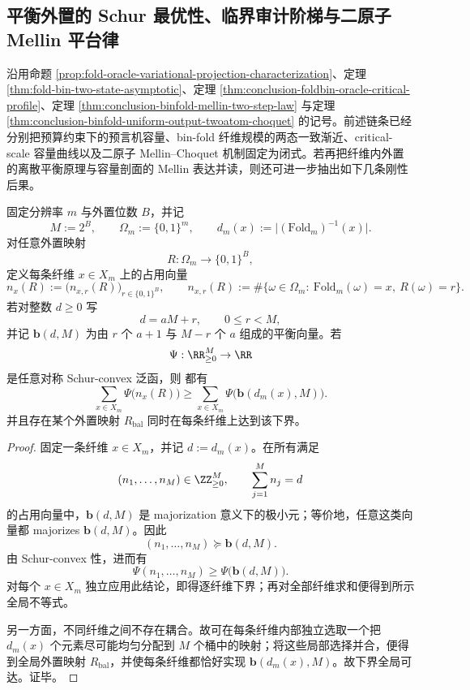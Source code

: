 \subsection{平衡外置的 Schur 最优性、临界审计阶梯与二原子 Mellin 平台律}\label{subsec:conclusion-balanced-externalization-harmonic-staircase-mellin-plateau}
沿用命题 \ref{prop:fold-oracle-variational-projection-characterization}、定理 \ref{thm:fold-bin-two-state-asymptotic}、定理 \ref{thm:conclusion-foldbin-oracle-critical-profile}、定理 \ref{thm:conclusion-binfold-mellin-two-step-law} 与定理 \ref{thm:conclusion-binfold-uniform-output-twoatom-choquet} 的记号。前述链条已经分别把预算约束下的预言机容量、bin-fold 纤维规模的两态一致渐近、critical-scale 容量曲线以及二原子 Mellin--Choquet 机制固定为闭式。若再把纤维内外置的离散平衡原理与容量剖面的 Mellin 表达并读，则还可进一步抽出如下几条刚性后果。

\begin{theorem}\label{thm:conclusion-balanced-externalization-schur-optimality}
固定分辨率 \(m\) 与外置位数 \(B\)，并记
\[
M:=2^B,\qquad
\Omega_m:=\{0,1\}^m,
\qquad
d_m(x):=\bigl|(\mathrm{Fold}_m)^{-1}(x)\bigr|.
\]
对任意外置映射
\[
R:\Omega_m\to\{0,1\}^B,
\]
定义每条纤维 \(x\in X_m\) 上的占用向量
\[
n_x(R):=\bigl(n_{x,r}(R)\bigr)_{r\in\{0,1\}^B},
\qquad
n_{x,r}(R):=\#\{\omega\in\Omega_m:\ \mathrm{Fold}_m(\omega)=x,\ R(\omega)=r\}.
\]
若对整数 \(d\ge 0\) 写
\[
d=aM+r,\qquad 0\le r<M,
\]
并记 \(\mathbf b(d,M)\) 为由 \(r\) 个 \(a+1\) 与 \(M-r\) 个 \(a\) 组成的平衡向量。若
\[
\Psi:\RR_{\ge 0}^{M}\to\RR
\]
是任意对称 Schur-convex 泛函，则
都有
\[
\sum_{x\in X_m}\Psi\!\bigl(n_x(R)\bigr)
\ge
\sum_{x\in X_m}\Psi\!\bigl(\mathbf b(d_m(x),M)\bigr).
\]
并且存在某个外置映射 \(R_{\mathrm{bal}}\) 同时在每条纤维上达到该下界。
\end{theorem}
\begin{proof}
固定一条纤维 \(x\in X_m\)，并记 \(d:=d_m(x)\)。在所有满足
\[
(n_1,\dots,n_M)\in \ZZ_{\ge 0}^M,
\qquad
\sum_{j=1}^{M}n_j=d
\]
的占用向量中，\(\mathbf b(d,M)\) 是 majorization 意义下的极小元；等价地，任意这类向量都 majorizes \(\mathbf b(d,M)\)。因此
\[
(n_1,\dots,n_M)\succcurlyeq \mathbf b(d,M).
\]
由 Schur-convex 性，进而有
\[
\Psi(n_1,\dots,n_M)\ge \Psi\!\bigl(\mathbf b(d,M)\bigr).
\]
对每个 \(x\in X_m\) 独立应用此结论，即得逐纤维下界；再对全部纤维求和便得到所示全局不等式。

另一方面，不同纤维之间不存在耦合。故可在每条纤维内部独立选取一个把 \(d_m(x)\) 个元素尽可能均匀分配到 \(M\) 个桶中的映射；将这些局部选择并合，便得到全局外置映射 \(R_{\mathrm{bal}}\)，并使每条纤维都恰好实现 \(\mathbf b(d_m(x),M)\)。故下界全局可达。证毕。
\end{proof}

